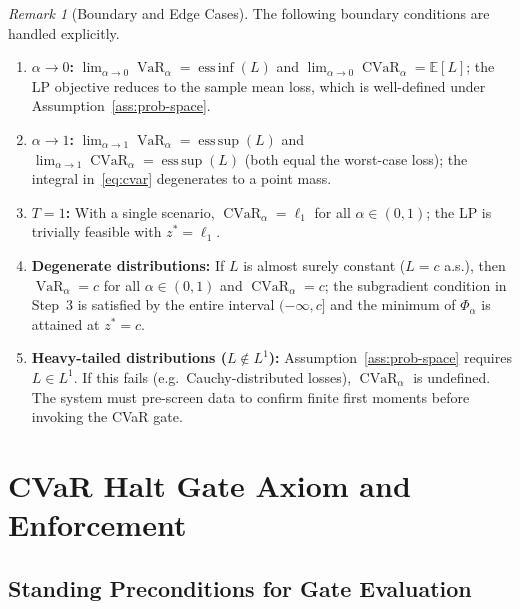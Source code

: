 \documentclass[12pt,openany]{book}
\newcommand{\E}{\mathbb{E}}
\numberwithin{equation}{chapter}
\theoremstyle{plain}
\theoremstyle{definition}
\theoremstyle{remark}
\newtheorem{remark}[theorem]{Remark}
\numberwithin{equation}{chapter}
\theoremstyle{plain}
\DeclareMathOperator{\CVaR}{CVaR}
\DeclareMathOperator{\VaR}{VaR}
\begin{document}
\begin{remark}[Boundary and Edge Cases]
\label{rem:cvar-edge}
The following boundary conditions are handled explicitly.
\begin{enumerate}
  \item \textbf{$\alpha \to 0$:}
        $\lim_{\alpha\to 0}\VaR_\alpha = \operatorname{ess\,inf}(L)$ and
        $\lim_{\alpha\to 0}\CVaR_\alpha = \E[L]$; the LP
        objective reduces to the sample mean loss, which is well-defined
        under Assumption~\ref{ass:prob-space}.
  \item \textbf{$\alpha \to 1$:}
        $\lim_{\alpha\to 1}\VaR_\alpha = \operatorname{ess\,sup}(L)$ and
        $\lim_{\alpha\to 1}\CVaR_\alpha = \operatorname{ess\,sup}(L)$ (both
        equal the worst-case loss); the integral in~\eqref{eq:cvar}
        degenerates to a point mass.
  \item \textbf{$T = 1$:}
        With a single scenario, $\CVaR_\alpha = \ell_1$ for all
        $\alpha \in (0,1)$; the LP is trivially feasible with
        $z^* = \ell_1$.
  \item \textbf{Degenerate distributions:}
        If $L$ is almost surely constant ($L = c$ a.s.), then
        $\VaR_\alpha = c$ for all $\alpha \in (0,1)$ and
        $\CVaR_\alpha = c$; the subgradient condition in Step~3
        is satisfied by the entire interval $(-\infty, c]$ and the
        minimum of $\Phi_\alpha$ is attained at $z^* = c$.
  \item \textbf{Heavy-tailed distributions ($L \notin L^1$):}
        Assumption~\ref{ass:prob-space} requires $L \in L^1$.  If
        this fails (e.g.\ Cauchy-distributed losses), $\CVaR_\alpha$
        is undefined.  The system must pre-screen data to confirm
        finite first moments before invoking the CVaR gate.
\end{enumerate}
\end{remark}

\section{CVaR Halt Gate Axiom and Enforcement}

\subsection{Standing Preconditions for Gate Evaluation}
\label{ssec:gate-preconditions}
\end{document}
